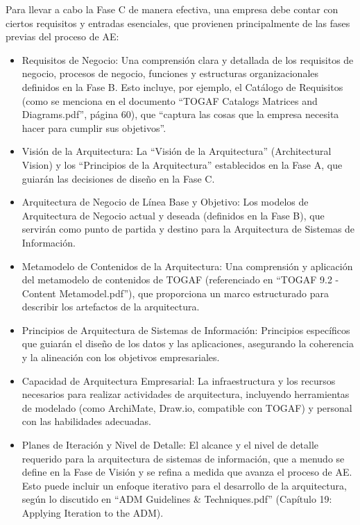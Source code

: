\documentclass[
	a4paper, %
	12pt, %
]{include/CSSullivanBusinessReport}
\def\tightlist{}
\begin{document}
Para llevar a cabo la Fase C de manera efectiva, una empresa debe contar
con ciertos requisitos y entradas esenciales, que provienen
principalmente de las fases previas del proceso de AE:

\begin{itemize}
\tightlist
\item
  Requisitos de Negocio: Una comprensión clara y detallada de los
  requisitos de negocio, procesos de negocio, funciones y estructuras
  organizacionales definidos en la Fase B. Esto incluye, por ejemplo, el
  Catálogo de Requisitos (como se menciona en el documento ``TOGAF
  Catalogs Matrices and Diagrams.pdf'', página 60), que ``captura las
  cosas que la empresa necesita hacer para cumplir sus objetivos''.
\item
  Visión de la Arquitectura: La ``Visión de la Arquitectura''
  (Architectural Vision) y los ``Principios de la Arquitectura''
  establecidos en la Fase A, que guiarán las decisiones de diseño en la
  Fase C.
\item
  Arquitectura de Negocio de Línea Base y Objetivo: Los modelos de
  Arquitectura de Negocio actual y deseada (definidos en la Fase B), que
  servirán como punto de partida y destino para la Arquitectura de
  Sistemas de Información.
\item
  Metamodelo de Contenidos de la Arquitectura: Una comprensión y
  aplicación del metamodelo de contenidos de TOGAF (referenciado en
  ``TOGAF 9.2 - Content Metamodel.pdf''), que proporciona un marco
  estructurado para describir los artefactos de la arquitectura.
\item
  Principios de Arquitectura de Sistemas de Información: Principios
  específicos que guiarán el diseño de los datos y las aplicaciones,
  asegurando la coherencia y la alineación con los objetivos
  empresariales.
\item
  Capacidad de Arquitectura Empresarial: La infraestructura y los
  recursos necesarios para realizar actividades de arquitectura,
  incluyendo herramientas de modelado (como ArchiMate, Draw.io,
  compatible con TOGAF) y personal con las habilidades adecuadas.
\item
  Planes de Iteración y Nivel de Detalle: El alcance y el nivel de
  detalle requerido para la arquitectura de sistemas de información, que
  a menudo se define en la Fase de Visión y se refina a medida que
  avanza el proceso de AE. Esto puede incluir un enfoque iterativo para
  el desarrollo de la arquitectura, según lo discutido en ``ADM
  Guidelines \& Techniques.pdf'' (Capítulo 19: Applying Iteration to the
  ADM).
\end{itemize}
\end{document}
